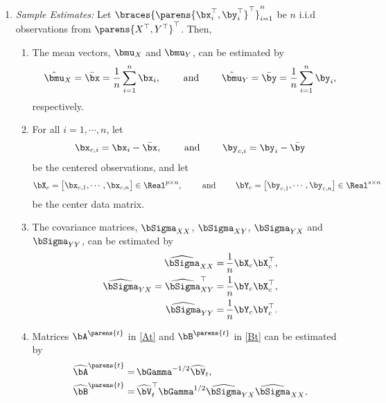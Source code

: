 \documentclass[12pt]{article}
\begin{document}
\begin{enumerate}[label=\textbf{\arabic*.}]
\begin{enumerate}
		\item \textit{Sample Estimates:} Let $\braces{\parens{\bx_i^\top, \by_i^\top}^{\top}}_{i=1}^n$ be $n$ i.i.d observations from $\parens{X^\top, Y^\top}^\top$. Then, 
		\begin{enumerate}
			\item The mean vectors, $\bmu_X$ and $\bmu_Y$, can be estimated by 
			\begin{align*}
				\hat{\bmu}_{X} = \bar{\bx} = \frac{1}{n} \sum_{i=1}^n \bx_i, \qquad \text{ and } \qquad \hat{\bmu}_{Y} = \bar{\by} = \frac{1}{n} \sum_{i=1}^n \by_i, 
			\end{align*}
			respectively. 
			\item For all $i = 1, \cdots, n$, let 
			\begin{align*}
				\bx_{c,i} = \bx_i - \bar{\bx}, \qquad \text{ and } \qquad \by_{c,i} = \by_i - \bar{\by}
			\end{align*}
			be the centered observations, and let 
			 \begin{align*}
				\bX_{c} = \begin{bmatrix}
					\bx_{c,1}, \cdots, \bx_{c,n}
				\end{bmatrix} \in \Real^{p \times n}, \qquad \text{ and } \qquad 
				\bY_{c} = \begin{bmatrix}
					\by_{c,1}, \cdots, \by_{c,n}
				\end{bmatrix} \in \Real^{s \times n}
			\end{align*}
			be the center data matrix. 
			\item The covariance matrices, $\bSigma_{XX}$, $\bSigma_{XY}$, $\bSigma_{YX}$ and $\bSigma_{YY}$, can be estimated by 
			\begin{align*}
				\widehat{\bSigma}_{XX} = & \, \frac{1}{n} \bX_c \bX_c^\top, \\ 
				\widehat{\bSigma}_{YX} = \widehat{\bSigma}_{XY}^\top = & \, \frac{1}{n} \bY_c \bX_c^\top, \\ 
				\widehat{\bSigma}_{YY} = & \, \frac{1}{n} \bY_c \bY_c^\top. 
			\end{align*}
			\item Matrices $\bA^{\parens{t}}$ in \eqref{At} and $\bB^{\parens{t}}$ in \eqref{Bt} can be estimated by 
			\begin{align*}
				\widehat{\bA}^{\parens{t}} = & \, \bGamma^{-1/2} \widehat{\bV}_t, \\ 
				\widehat{\bB}^{\parens{t}} = & \, \widehat{\bV}_t^\top \bGamma^{1/2} \widehat{\bSigma}_{YX} \widehat{\bSigma}_{XX}, 
			\end{align*}

\end{enumerate}
\end{enumerate}
\end{enumerate}
\end{document}

